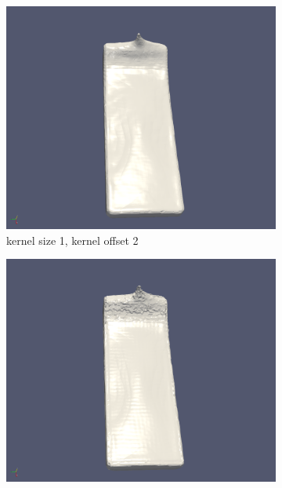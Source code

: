 \begin{figure}
\begin{subfigure}[b]{0.5\textwidth}
               \label{fig:ks1ko1}
        \end{subfigure}
        \begin{subfigure}[b]{0.5\textwidth}
               \includegraphics[width=\textwidth]{figures/DBBlur_ks-1_ko-2.png}
               \caption{kernel size 1, kernel offset 2}
               \label{fig:ks1ko2}
        \end{subfigure}
        \begin{subfigure}[b]{0.5\textwidth}
               \includegraphics[width=\textwidth]{figures/DBBlur_ks-1_ko-4.png}

\end{subfigure}
\end{figure}
